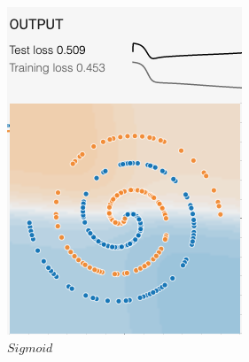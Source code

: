 \documentclass[12pt,a4paper]{article}
\begin{document}
\begin{enumerate}
\begin{figure}[H]
\begin{subfigure}[H]{0.2\textwidth}
				\includegraphics[width=\textwidth]{Figures/activation/sigmoid}
				\caption{$Sigmoid$}
			\end{subfigure}
			\begin{subfigure}[H]{0.2\textwidth}
				\centering

\end{subfigure}
\end{figure}
\end{enumerate}
\end{document}
